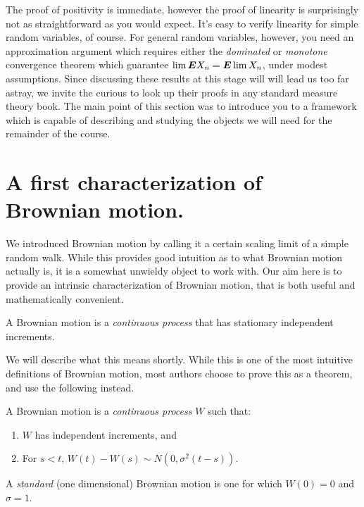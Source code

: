 The proof of positivity is immediate, however the proof of linearity is surprisingly not as straightforward as you would expect.
It's easy to verify linearity for simple random variables, of course.
For general random variables, however, you need an approximation argument which requires either the \emph{dominated} or \emph{monotone} convergence theorem which guarantee $\lim \bm{E} X_n = \bm{E} \lim X_n$, under modest assumptions.
Since discussing these results at this stage will will lead us too far astray, we invite the curious to look up their proofs in any standard measure theory book.
The main point of this section was to introduce you to a framework which is capable of describing and studying the objects we will need for the remainder of the course.

\section{A first characterization of Brownian motion.}

We introduced Brownian motion by calling it a certain scaling limit of a simple random walk.
While this provides good intuition as to what Brownian motion actually is, it is a somewhat unwieldy object to work with.
Our aim here is to provide an intrinsic characterization of Brownian motion, that is both useful and mathematically convenient.

\begin{definition}\label{d:bm1}
  A Brownian motion is a \emph{continuous process} that has stationary independent increments.
\end{definition}

We will describe what this means shortly.
While this is one of the most intuitive definitions of Brownian motion, most authors choose to prove this as a theorem, and use the following instead.

\begin{definition}
  A Brownian motion is a \emph{continuous process} $W$ such that:
  \begin{enumerate}
    \item
       $W$ has independent increments, and
    \item
      For $s < t$, $W(t) - W(s) \sim N(0, \sigma^2 (t - s))$.
  \end{enumerate}
\end{definition}
\begin{remark}
  A \emph{standard} (one dimensional) Brownian motion is one for which $W(0) = 0$ and $\sigma = 1$.
\end{remark}

